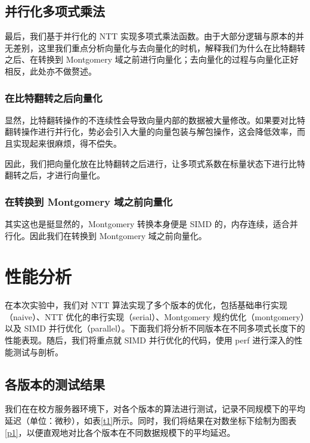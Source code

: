\documentclass[a4paper]{article}
\begin{document}
\subsection{并行化多项式乘法}

最后，我们基于并行化的 NTT 实现多项式乘法函数。由于大部分逻辑与原本的并无差别，这里我们重点分析向量化与去向量化的时机，解释我们为什么在比特翻转之后、在转换到 Montgomery 域之前进行向量化；去向量化的过程与向量化正好相反，此处亦不做赘述。

\subsubsection{在比特翻转之后向量化}

显然，比特翻转操作的不连续性会导致向量内部的数据被大量修改。如果要对比特翻转操作进行并行化，势必会引入大量的向量包装与解包操作，这会降低效率，而且实现起来很麻烦，得不偿失。

因此，我们把向量化放在比特翻转之后进行，让多项式系数在标量状态下进行比特翻转之后，才进行向量化。

\subsubsection{在转换到 Montgomery 域之前向量化}

其实这也是挺显然的，Montgomery 转换本身便是 SIMD 的，内存连续，适合并行化。因此我们在转换到 Montgomery 域之前向量化。

\section{性能分析}

在本次实验中，我们对 NTT 算法实现了多个版本的优化，包括基础串行实现（naive）、NTT 优化的串行实现（serial）、Montgomery 规约优化（montgomery）以及 SIMD 并行优化（parallel）。下面我们将分析不同版本在不同多项式长度下的性能表现。随后，我们将重点就 SIMD 并行优化的代码，使用 perf 进行深入的性能测试与剖析。

\subsection{各版本的测试结果}

我们在在校方服务器环境下，对各个版本的算法进行测试，记录不同规模下的平均延迟（单位：微秒），如表\ref{t1}所示。同时，我们将结果在对数坐标下绘制为图表\ref{p1}，以便直观地对比各个版本在不同数据规模下的平均延迟。
\end{document}
